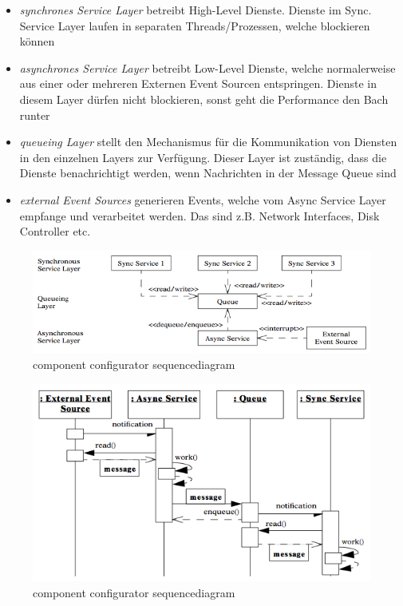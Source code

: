 \begin{itemize}
	\item \emph{synchrones Service Layer} betreibt High-Level Dienste. Dienste im Sync. Service Layer laufen in separaten Threads/Prozessen, welche blockieren können
	\item \emph{asynchrones Service Layer} betreibt Low-Level Dienste, welche normalerweise aus einer oder mehreren Externen Event Sourcen entspringen. Dienste in diesem Layer dürfen nicht blockieren, sonst geht die Performance den Bach runter
	\item \emph{queueing Layer} stellt den Mechanismus für die Kommunikation von Diensten in den einzelnen Layers zur Verfügung. Dieser Layer ist zuständig, dass die Dienste benachrichtigt werden, wenn Nachrichten in der Message Queue sind
	\item \emph{external Event Sources} generieren Events, welche vom Async Service Layer empfange und verarbeitet werden. Das sind z.B. Network Interfaces, Disk Controller etc.
\end{itemize}

\begin{figure}[H]
	\centering
	\includegraphics[width=\textwidth]{content/posa2/half-sync-half-async/images/Bildschirmfoto_2013-05-13_um_1.png}
	\caption{component configurator sequencediagram}
\end{figure}

\begin{figure}[H]
	\centering
	\includegraphics[width=\textwidth]{content/posa2/half-sync-half-async/images/Bildschirmfoto_2013-05-13_um_2.png}
	\caption{component configurator sequencediagram}
\end{figure}

